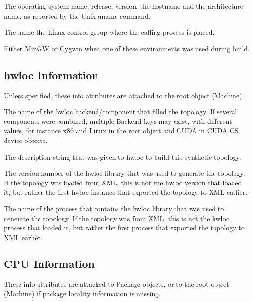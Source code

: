 \begin{DoxyDescription}
\item[O\+S\+Name, O\+S\+Release, O\+S\+Version, Host\+Name, Architecture ]The operating system name, release, version, the hostname and the architecture name, as reported by the Unix {\ttfamily uname} command.  
\item[Linux\+Cgroup ]The name the Linux control group where the calling process is placed.  
\item[Windows\+Build\+Environment ]Either Min\+GW or Cygwin when one of these environments was used during build.  
\end{DoxyDescription}

 \hypertarget{a00386_attributes_info_hwloc}{}\subsection{hwloc Information}\label{a00386_attributes_info_hwloc}
Unless specified, these info attributes are attached to the root object (Machine).


\begin{DoxyDescription}
\item[Backend (topology root, or specific object added by that backend) ]The name of the hwloc backend/component that filled the topology. If several components were combined, multiple Backend keys may exist, with different values, for instance {\ttfamily x86} and {\ttfamily Linux} in the root object and {\ttfamily C\+U\+DA} in C\+U\+DA OS device objects.  
\item[Synthetic\+Description ]The description string that was given to hwloc to build this synthetic topology.  
\item[hwloc\+Version ]The version number of the hwloc library that was used to generate the topology. If the topology was loaded from X\+ML, this is not the hwloc version that loaded it, but rather the first hwloc instance that exported the topology to X\+ML earlier.  
\item[Process\+Name ]The name of the process that contains the hwloc library that was used to generate the topology. If the topology was from X\+ML, this is not the hwloc process that loaded it, but rather the first process that exported the topology to X\+ML earlier.  
\end{DoxyDescription}

 \hypertarget{a00386_attributes_info_cpu}{}\subsection{C\+P\+U Information}\label{a00386_attributes_info_cpu}
These info attributes are attached to Package objects, or to the root object (Machine) if package locality information is missing.


